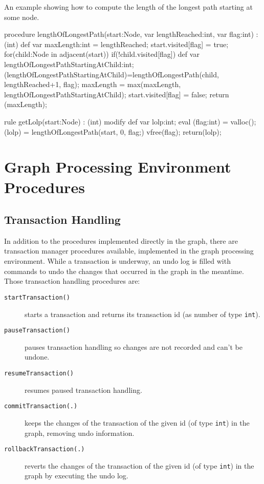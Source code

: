 \begin{example}
An example showing how to compute the length of the longest path starting at some node.
\begin{grgen}
procedure lengthOfLongestPath(start:Node, var lengthReached:int, var flag:int) : (int)
{
	def var maxLength:int = lengthReached;
	start.visited[flag] = true;
	for(child:Node in adjacent(start)) {
		if(!child.visited[flag]) {
			def var lengthOfLongestPathStartingAtChild:int;
			(lengthOfLongestPathStartingAtChild)=lengthOfLongestPath(child, lengthReached+1, flag);
			maxLength = max(maxLength, lengthOfLongestPathStartingAtChild);
		}
	}
	start.visited[flag] = false;
	return (maxLength);
}

rule getLolp(start:Node) : (int)
{
	modify {
		def var lolp:int;
		eval {
			(flag:int) = valloc();
			(lolp) = lengthOfLongestPath(start, 0, flag;)
			vfree(flag);
		}
		return(lolp);
	}
}
\end{grgen}
\end{example}

\section{Graph Processing Environment Procedures}

\subsection{Transaction Handling}\label{sub:transaction}

In addition to the procedures implemented directly in the graph, there are transaction manager procedures available, implemented in the graph processing environment.
While a transaction is underway, an undo log is filled with commands to undo the changes that occurred in the graph in the meantime.
Those transaction handling procedures are:

\begin{description}
\item[\texttt{startTransaction()}] starts a transaction and returns its transaction id (as number of type \texttt{int}).
\item[\texttt{pauseTransaction()}] pauses transaction handling so changes are not recorded and can't be undone.
\item[\texttt{resumeTransaction()}] resumes paused transaction handling.
\item[\texttt{commitTransaction(.)}] keeps the changes of the transaction of the given id (of type \texttt{int}) in the graph, removing undo information.
\item[\texttt{rollbackTransaction(.)}] reverts the changes of the transaction of the given id (of type \texttt{int}) in the graph by executing the undo log.
\end{description}

